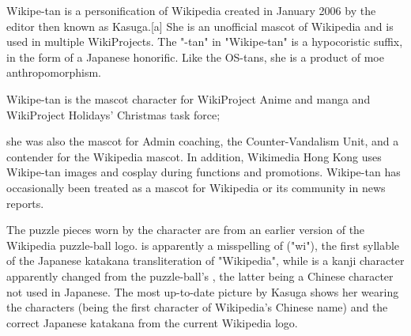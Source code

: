 Wikipe-tan  is a personification of Wikipedia created in January 2006 by the editor then known as Kasuga.[a] She is an unofficial mascot of Wikipedia and is used in multiple WikiProjects. The "-tan" in "Wikipe-tan" is a hypocoristic suffix, in the form of a Japanese honorific. Like the OS-tans, she is a product of moe anthropomorphism.

Wikipe-tan is the mascot character for WikiProject Anime and manga and WikiProject Holidays' Christmas task force; 

she was also the mascot for Admin coaching, the Counter-Vandalism Unit, and a contender for the Wikipedia mascot. In addition, Wikimedia Hong Kong uses Wikipe-tan images and cosplay during functions and promotions. Wikipe-tan has occasionally been treated as a mascot for Wikipedia or its community in news reports.

The puzzle pieces worn by the character are from an earlier version of the Wikipedia puzzle-ball logo.  is apparently a misspelling of  ("wi"), the first syllable of the Japanese katakana transliteration of "Wikipedia", while  is a kanji character apparently changed from the puzzle-ball's , the latter being a Chinese character not used in Japanese. The most up-to-date picture by Kasuga shows her wearing the characters  (being the first character of Wikipedia's Chinese name) and the correct Japanese katakana from the current Wikipedia logo.



